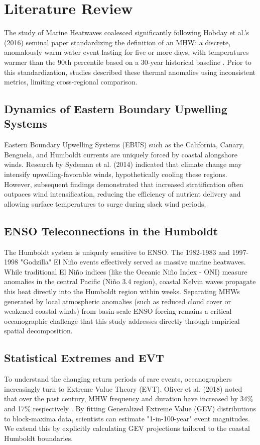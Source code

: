 \documentclass[11pt,a4paper]{article}
\begin{document}
\section{Literature Review}
The study of Marine Heatwaves coalesced significantly following Hobday et al.'s (2016) seminal paper standardizing the definition of an MHW: a discrete, anomalously warm water event lasting for five or more days, with temperatures warmer than the 90th percentile based on a 30-year historical baseline \cite{hobday2016}. Prior to this standardization, studies described these thermal anomalies using inconsistent metrics, limiting cross-regional comparison.

\subsection{Dynamics of Eastern Boundary Upwelling Systems}
Eastern Boundary Upwelling Systems (EBUS) such as the California, Canary, Benguela, and Humboldt currents are uniquely forced by coastal alongshore winds. Research by Sydeman et al. (2014) indicated that climate change may intensify upwelling-favorable winds, hypothetically cooling these regions. However, subsequent findings demonstrated that increased stratification often outpaces wind intensification, reducing the efficiency of nutrient delivery and allowing surface temperatures to surge during slack wind periods.

\subsection{ENSO Teleconnections in the Humboldt}
The Humboldt system is uniquely sensitive to ENSO. The 1982-1983 and 1997-1998 "Godzilla" El Niño events effectively served as massive marine heatwaves. While traditional El Niño indices (like the Oceanic Niño Index - ONI) measure anomalies in the central Pacific (Niño 3.4 region), coastal Kelvin waves propagate this heat directly into the Humboldt region within weeks. Separating MHWs generated by local atmospheric anomalies (such as reduced cloud cover or weakened coastal winds) from basin-scale ENSO forcing remains a critical oceanographic challenge that this study addresses directly through empirical spatial decomposition.

\subsection{Statistical Extremes and EVT}
To understand the changing return periods of rare events, oceanographers increasingly turn to Extreme Value Theory (EVT). Oliver et al. (2018) noted that over the past century, MHW frequency and duration have increased by 34\% and 17\% respectively \cite{oliver2018}. By fitting Generalized Extreme Value (GEV) distributions to block-maxima data, scientists can estimate "1-in-100-year" event magnitudes. We extend this by explicitly calculating GEV projections tailored to the coastal Humboldt boundaries.
\end{document}
